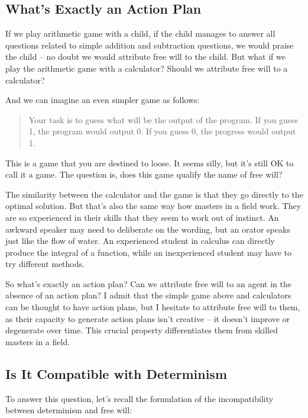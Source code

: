 \subsection{What's Exactly an Action Plan}

If we play arithmetic game with a child, if the child manages to answer all questions related to simple addition and subtraction questions, we would praise the child -- no doubt we would attribute free will to the child. But what if we play the arithmetic game with a calculator? Should we attribute free will to a calculator?

And we can imagine an even simpler game as follows:

\begin{quote}
  Your task is to guess what will be the output of the program. If you guess 1, the program would output 0. If you guess 0, the progress would output 1.
\end{quote}

This is a game that you are destined to loose. It seems silly, but it's still OK to call it a game. The question is, does this game qualify the name of free will?

The similarity between the calculator and the game is that they go directly to the optimal solution. But that's also the same way how masters in a field work. They are so experienced in their skills that they seem to work out of instinct. An awkward speaker may need to deliberate on the wording, but an orator speaks just like the flow of water. An experienced student in calculus can directly produce the integral of a function, while an inexperienced student may have to try different methods.

So what's exactly an action plan? Can we attribute free will to an agent in the absence of an action plan? I admit that the simple game above and calculators can be thought to have action plans, but I hesitate to attribute free will to them, as their capacity to generate action plans isn't creative -- it doesn't improve or degenerate over time. This crucial property differentiates them from skilled masters in a field.

\subsection{Is It Compatible with Determinism}

To answer this question, let's recall the formulation of the incompatibility between determinism and free will:

